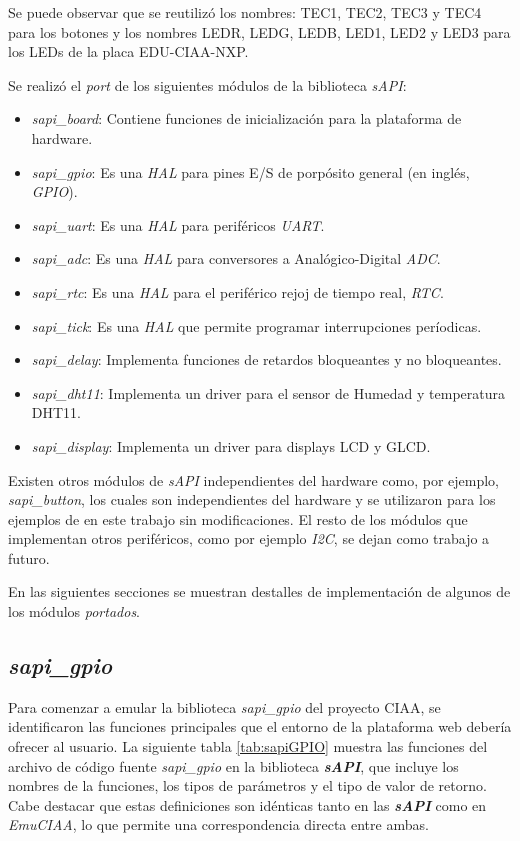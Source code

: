 Se puede observar que se reutilizó los nombres: TEC1, TEC2, TEC3 y TEC4 para los botones y los nombres LEDR, LEDG, LEDB, LED1, LED2 y LED3 para los LEDs de la placa EDU-CIAA-NXP.

Se realizó el \textit{port} de los siguientes módulos de la biblioteca \textit{sAPI}:

\begin{itemize}
    \item \textit{sapi\_board}: Contiene funciones de inicialización para la plataforma de hardware.
    \item \textit{sapi\_gpio}: Es una \textit{HAL} para pines E/S de porpósito general (en inglés, \textit{GPIO}).
    \item \textit{sapi\_uart}: Es una \textit{HAL} para periféricos \textit{UART}.
    \item \textit{sapi\_adc}: Es una \textit{HAL} para conversores a Analógico-Digital \textit{ADC}.
    \item \textit{sapi\_rtc}: Es una \textit{HAL} para el periférico rejoj de tiempo real, \textit{RTC}.
    \item \textit{sapi\_tick}: Es una \textit{HAL} que permite programar interrupciones períodicas.
    \item \textit{sapi\_delay}: Implementa funciones de retardos bloqueantes y no bloqueantes.
    \item \textit{sapi\_dht11}: Implementa un driver para el sensor de Humedad y temperatura DHT11.
    \item \textit{sapi\_display}: Implementa un driver para displays LCD y GLCD.
\end{itemize}

Existen otros módulos de \textit{sAPI} independientes del hardware como, por ejemplo, \textit{sapi\_button}, los cuales son independientes del hardware y se utilizaron para los ejemplos de en este trabajo sin modificaciones. El resto de los módulos que implementan otros periféricos, como por ejemplo \textit{I2C}, se dejan como trabajo a futuro.

En las siguientes secciones se muestran destalles de implementación de algunos de los módulos \textit{portados}.

\subsection{\textit{\textbf{sapi\_gpio}}}

Para comenzar a emular la biblioteca \textit{sapi\_gpio} del proyecto CIAA, se identificaron las funciones principales que el entorno de la plataforma web debería ofrecer al usuario. La siguiente tabla \ref{tab:sapiGPIO} muestra las funciones del archivo de código fuente \textit{sapi\_gpio} en la biblioteca \textit{\textbf{sAPI}}, que incluye los nombres de la funciones, los tipos de parámetros y el tipo de valor de retorno. Cabe destacar que estas definiciones son idénticas tanto en las \textit{\textbf{sAPI}} como en \textit{EmuCIAA}, lo que permite una correspondencia directa entre ambas.

